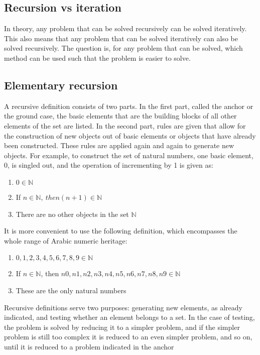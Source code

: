 \documentclass{report}
\begin{document}
    \pagebreak 
    \bigbreak \noindent 
    \subsection{Recursion vs iteration}
    \bigbreak \noindent 
    In theory, any problem that can be solved recursively can be solved iteratively. This also means that any problem that can be solved iteratively can also be solved recursively.
    \bigbreak \noindent 
    The question is, for any problem that can be solved, which method can be used such that the problem is easier to solve.

    \pagebreak \bigbreak \noindent 
    \subsection{Elementary recursion}
    \bigbreak \noindent 
    A recursive definition consists of two parts. In the first part, called the anchor or
    the ground case, the basic elements that are the building blocks of all other elements
    of the set are listed. In the second part, rules are given that allow for the construction
    of new objects out of basic elements or objects that have already been constructed.
    These rules are applied again and again to generate new objects. For example, to construct the set of natural numbers, one basic element, 0, is singled out, and the operation of incrementing by 1 is given as:
    \begin{enumerate}
        \item $0 \in \mathbb{N}$
        \item If $n\in \mathbb{N},\ then (n+1) \in \mathbb{N}$
        \item There are no other objects in the set $\mathbb{N}$
    \end{enumerate}
    It is more convenient to use the following definition, which encompasses the whole range of Arabic numeric heritage:
    \begin{enumerate}
        \item $0, 1,2,3,4,5,6,7,8,9 \in \mathbb{N} $
        \item If $n\in \mathbb{N}$, then $n0, n1,n2,n3,n4,n5,n6,n7,n8,n9 \in \mathbb{N}$
        \item These are the only natural numbers
    \end{enumerate}
    \bigbreak \noindent 
    Recursive definitions serve two purposes: generating new elements, as already
    indicated, and testing whether an element belongs to a set. In the case of testing, the
    problem is solved by reducing it to a simpler problem, and if the simpler problem is
    still too complex it is reduced to an even simpler problem, and so on, until it is reduced to a problem indicated in the anchor
\end{document}
